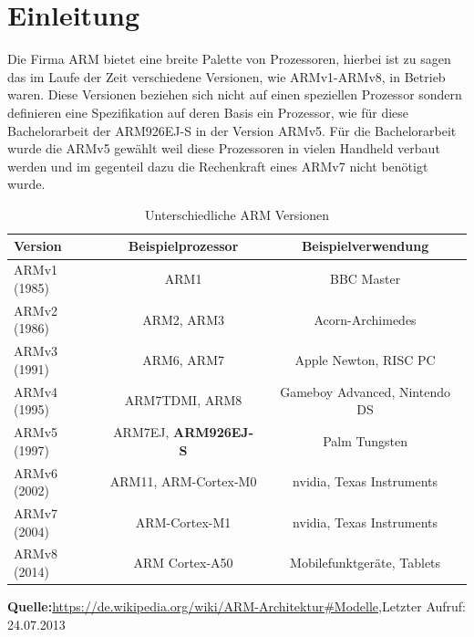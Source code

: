 \section{Einleitung}
Die Firma ARM bietet eine breite Palette von Prozessoren, hierbei ist zu sagen das im Laufe der Zeit verschiedene Versionen, wie ARMv1-ARMv8, in Betrieb waren. Diese Versionen beziehen sich nicht auf einen speziellen Prozessor sondern definieren eine Spezifikation auf deren Basis ein Prozessor, wie f\"ur diese Bachelorarbeit der ARM926EJ-S in der Version ARMv5. F\"ur die Bachelorarbeit wurde die ARMv5 gew\"ahlt weil diese Prozessoren in vielen Handheld verbaut werden und im gegenteil dazu die Rechenkraft eines ARMv7 nicht ben\"otigt wurde.
\begin{table}[h!]
\centering
\begin{tabular}{|l|c|c|}
\hline
Version & Beispielprozessor & Beispielverwendung \\ \hline
ARMv1 (1985) & ARM1 & BBC Master \\ \hline
ARMv2 (1986) & ARM2, ARM3 & Acorn-Archimedes \\ \hline
ARMv3 (1991) & ARM6, ARM7 & Apple Newton, RISC PC \\ \hline
ARMv4 (1995) & ARM7TDMI, ARM8 & Gameboy Advanced, Nintendo DS \\ \hline
ARMv5 (1997) & ARM7EJ, \textbf{ARM926EJ-S} & Palm Tungsten \\ \hline
ARMv6 (2002) & ARM11, ARM-Cortex-M0 & nvidia, Texas Instruments \\ \hline
ARMv7 (2004) & ARM-Cortex-M1 & nvidia, Texas Instruments  \\ \hline
ARMv8 (2014) & ARM Cortex-A50 & Mobilefunktger\"ate, Tablets \\ \hline
\end{tabular}\vspace{0.5cm}
\footnotesize\textbf{Quelle:}\url{https://de.wikipedia.org/wiki/ARM-Architektur#Modelle},Letzter Aufruf: 24.07.2013
\caption{Unterschiedliche ARM Versionen}
\end{table}
\newpage
